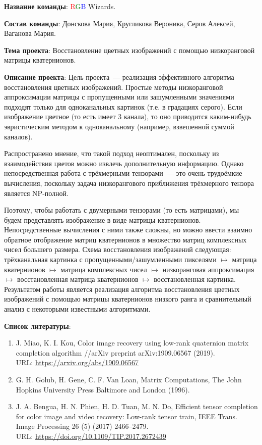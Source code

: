 \documentclass[12pt]{article}
\begin{document}
\textbf{Название команды}:
\textcolor{red}{R}\textcolor{green}{G}\textcolor{blue}{B} Wizards.
\vspace{5mm}


\textbf{Состав команды}:
Донскова Мария, Кругликова Вероника, Серов Алексей, Ваганова Мария.
\vspace{5mm}


\textbf{Тема проекта}:
Восстановление цветных изображений с помощью низкоранговой матрицы кватернионов.
\vspace{5mm}


\textbf{Описание проекта}:
Цель проекта~--- реализация эффективного алгоритма восстановления цветных изображений.
Простые методы низкоранговой аппроксимации матрицы с пропущенными или зашумленными значениями подходят только для одноканальных картинок (т.е. в градациях серого).
Если изображение цветное (то есть имеет 3 канала), то оно приводится каким-нибудь эвристическим методом к одноканальному (например, взвешенной суммой каналов).

Распространено мнение, что такой подход неоптимален, поскольку из взаимодействия цветов можно извлечь дополнительную информацию.
Однако непосредственная работа с трёхмерными тензорами~--- это очень трудоёмкие вычисления, поскольку задача низкорангового приближения трёхмерного тензора является NP-полной.

Поэтому, чтобы работать с двумерными тензорами (то есть матрицами), мы будем представлять изображение в виде матрицы кватернионов.
Непосредственные вычисления с ними также сложны, но можно ввести взаимно обратное отображение матриц кватернионов в множество матриц комплексных чисел большего размера.
Схема восстановления изображений следующая: трёхканальная картинка с пропущенными/зашумленными пикселями $\mapsto$ матрица кватернионов $\mapsto$ матрица комплексных чисел $\mapsto$ низкоранговая аппроксимация $\mapsto$ восстановленная матрица кватернионов $\mapsto$ восстановленная картинка.
Результатом работы является реализация алгоритма восстановления цветных изображений с помощью матрицы кватернионов низкого ранга и сравнительный анализ с некоторыми известными алгоритмами.
\vspace{5mm}


\textbf{Список литературы}:
\begin{enumerate}[label=\arabic*)]
    \item
	J. Miao, K. I. Kou, Color image recovery using low-rank quaternion matrix completion algorithm //arXiv preprint arXiv:1909.06567 (2019).\\
	URL: \href{https://arxiv.org/abs/1909.06567}{https://arxiv.org/abs/1909.06567}

    \item
	G. H. Golub, H. Gene, C. F. Van Loan, Matrix Computations, The John Hopkins University Press Baltimore and London (1996).

    \item
	J. A. Bengua, H. N. Phien, H. D. Tuan, M. N. Do, Efficient tensor completion for color image and video recovery: Low-rank tensor train, IEEE Trans. Image Processing 26 (5) (2017) 2466–2479. \\
	URL: \href{https://doi.org/10.1109/TIP.2017.2672439}{https://doi.org/10.1109/TIP.2017.2672439}
\end{enumerate}
\end{document}
